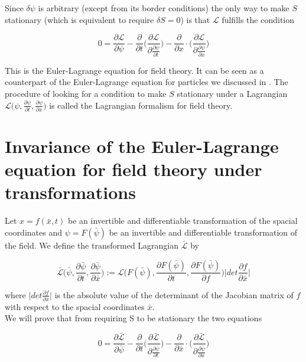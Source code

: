 \documentclass{article}
\begin{document}
Since $\delta \psi$ is arbitrary (except from its border conditions) the only way to make $S$ stationary (which is equivalent to require $\delta S = 0$) is that $\mathcal{L}$ fulfills the condition


\begin{equation}
0 = \frac{\partial \mathcal{L}}{\partial \psi}
-\frac{\partial}{\partial t} \bigg( \frac{\partial \mathcal{L}}{\partial \frac{\partial \psi}{\partial t}} \bigg) 
-\frac{\partial}{\partial x} \cdot \bigg( \frac{\partial \mathcal{L}}{\partial \frac{\partial \psi}{\partial x}} \bigg) 
\end{equation}

This is the Euler-Lagrange equation for field theory. It can be seen as a counterpart of the Euler-Lagrange equation for particles we discussed in \cite{WagnerGuthrie}. The procedure of looking for a condition to make $S$ stationary under a Lagrangian $\mathcal{L}\bigg(\psi, \frac{\partial \psi}{\partial t}, \frac{\partial \psi}{\partial x}\bigg)$ is called the Lagrangian formalism for field theory.

\section{Invariance of the Euler-Lagrange equation for field theory under transformations}

Let $x=f(\bar{x},t)$ be an invertible and differentiable transformation of the spacial coordinates and $\psi=F(\bar{\psi})$ be an invertible and differentiable transformation of the field. We define the transformed Lagrangian  $\bar{\mathcal{L}}$ by

\begin{equation} \label{LagrTransform}
\bar{\mathcal{L}}\bigg(\bar{\psi}, \frac{\partial \bar{\psi}}{\partial t}, \frac{\partial \bar{\psi}}{\partial \bar{x}}\bigg) 
:= \mathcal{L}\bigg(F(\bar{\psi}), \frac{\partial F(\bar{\psi})}{\partial t}, \frac{\partial F(\bar{\psi})}{\partial f}\bigg) 
\bigg| det \frac{\partial f}{\partial \bar{x}} \bigg|
\end{equation}

where $\bigg| det \frac{\partial f}{\partial \bar{x}} \bigg|$ is the absolute value of the determinant of the Jacobian matrix of $f$ with respect to the spacial coordinates $\bar{x}$. \\

We will prove that from requiring S to be stationary the two equations

\begin{equation} \label{ELGTransformed}
0 = \frac{\partial \bar{\mathcal{L}}}{\partial \bar{\psi}}
-\frac{\partial}{\partial t} \bigg( \frac{\partial \mathcal{\bar{L}}}{\partial \frac{\partial \bar{\psi}}{\partial t}} \bigg) 
-\frac{\partial}{\partial \bar{x}} \cdot \bigg( \frac{\partial \mathcal{\bar{L}}}{\partial \frac{\partial \bar{\psi}}{\partial \bar{x}}} \bigg) 
\end{equation}
\end{document}
